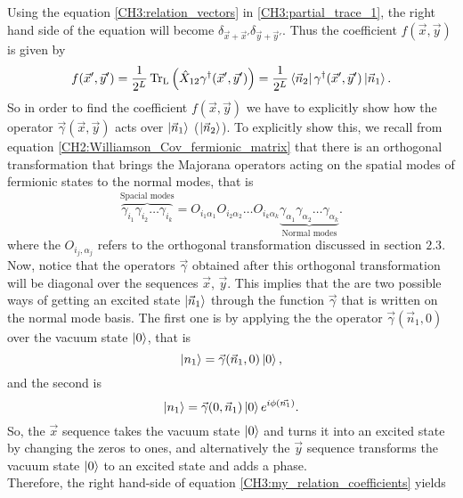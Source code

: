 Using the equation \eqref{CH3:relation_vectors} in \eqref{CH3:partial_trace_1}, the right hand side of the equation will become $\delta_{\vec{x}+\vec{x}'}\delta_{\vec{y}+\vec{y}'}$. Thus the coefficient $f(\vec{x},\vec{y})$ is given by
\begin{equation}
f(\vec{x}',\vec{y}') = \frac{1}{2^L}\operatorname{Tr_L}\left(\hat{X}_{12}\gamma^{\dagger}(\vec{x}',\vec{y}')\right)=\frac{1}{2^L} \mathinner{\langle{\vec{n}_2}|}\gamma^{\dagger}(\vec{x}',\vec{y}')\mathinner{|{\vec{n}_1}\rangle}.
\label{CH3:my_relation_coefficients}
\end{equation}
So in order to find the coefficient $f(\vec{x},\vec{y})$ we have to explicitly show how the operator $\vec{\gamma}(\vec{x},\vec{y})$ acts over $\mathinner{|{\vec{n}_1}\rangle}$ ($\mathinner{|{\vec{n}_2}\rangle}$). To explicitly show this, we recall from equation \eqref{CH2:Williamson_Cov_fermionic_matrix} that there is an orthogonal transformation that brings the Majorana operators acting on the spatial modes of fermionic states to the normal modes, that is
\begin{equation}
\overbrace{\gamma_{i_1}\gamma_{i_2}\ldots\gamma_{i_k}}^{\text{Spacial modes}}= O_{i_1\alpha_1}O_{i_2\alpha_2}\ldots O_{i_k\alpha_k} \underbrace{\gamma_{\alpha_1}\gamma_{\alpha_2}\ldots\gamma_{\alpha_k}}_{\text{Normal modes}}.
\label{CH3:transformation_to_normal_modes}
\end{equation}
where the $O_{i_j,\alpha_j}$ refers to the orthogonal transformation discussed in section $2.3$. Now, notice that the operators $\vec{\gamma}$ obtained after this orthogonal transformation will be diagonal over the sequences $\vec{x}$, $\vec{y}$. This implies that the are two possible ways of getting an excited state $\mathinner{|{\vec{n}_1}\rangle}$ through the function $\vec{\gamma}$ that is written on the normal mode basis. The first one is by applying the the operator $\vec{\gamma}(\vec{n}_1,0)$ over the vacuum state $\mathinner{|{0}\rangle}$, that is
\begin{equation}
\mathinner{|{n_1}\rangle}=\vec{\gamma}(\vec{n}_1,0)\mathinner{|{0}\rangle},
\end{equation}
and the second is
\begin{equation}
\mathinner{|{n_1}\rangle}=\vec{\gamma}(0,\vec{n}_1)\mathinner{|{0}\rangle}e^{i\phi(\vec{n_1})}.
\end{equation}
So, the $\vec{x}$ sequence takes the vacuum state $\mathinner{|{0}\rangle}$ and turns it into an excited state by changing the zeros to ones, and alternatively the $\vec{y}$ sequence transforms the vacuum state $\mathinner{|{0}\rangle}$ to an excited state and adds a phase.\\
\indent Therefore, the right hand-side of equation \eqref{CH3:my_relation_coefficients} yields

